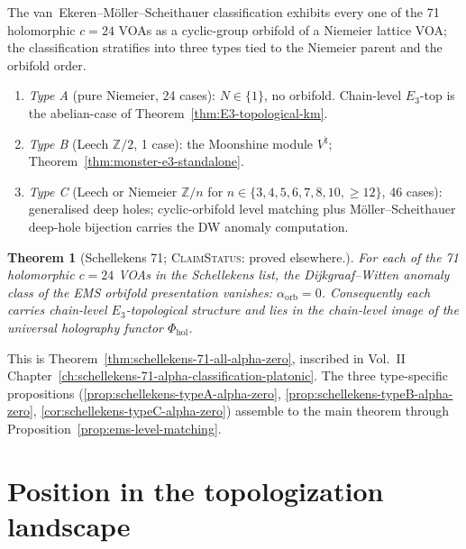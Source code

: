 \documentclass[11pt]{amsart}
\newtheorem{theorem}{Theorem}[section]
\theoremstyle{definition}
\theoremstyle{remark}
\providecommand{\Z}{\mathbb{Z}}
\providecommand{\ClaimStatusProvedElsewhere}{\textsc{ClaimStatus}: proved elsewhere.}
\begin{document}
The van~Ekeren--M\"oller--Scheithauer classification exhibits every
one of the 71 holomorphic $c = 24$ VOAs as a cyclic-group orbifold
of a Niemeier lattice VOA; the classification stratifies into three
types tied to the Niemeier parent and the orbifold order.

\begin{enumerate}[label=(\alph*)]
\item \emph{Type A} (pure Niemeier, 24 cases): $N \in \{1\}$, no
orbifold. Chain-level $E_3$-top is the abelian-case of
Theorem~\ref*{thm:E3-topological-km}.
\item \emph{Type B} (Leech $\Z/2$, 1 case): the Moonshine module
$V^\natural$; Theorem~\ref{thm:monster-e3-standalone}.
\item \emph{Type C} (Leech or Niemeier $\Z/n$ for
$n \in \{3,4,5,6,7,8,10,\geq 12\}$, 46 cases): generalised deep
holes; cyclic-orbifold level matching plus M\"oller--Scheithauer
deep-hole bijection carries the DW anomaly computation.
\end{enumerate}

\begin{theorem}[Schellekens 71; \ClaimStatusProvedElsewhere]
\label{thm:schellekens-71-standalone}
For each of the 71 holomorphic $c = 24$ VOAs in the Schellekens list,
the Dijkgraaf--Witten anomaly class of the EMS orbifold
presentation vanishes: $\alpha_{\mathrm{orb}} = 0$. Consequently each
carries chain-level $E_3$-topological structure and lies in the
chain-level image of the universal holography functor
$\Phi_{\mathrm{hol}}$.
\end{theorem}

This is Theorem~\ref*{thm:schellekens-71-all-alpha-zero}, inscribed
in Vol.~II Chapter~\ref*{ch:schellekens-71-alpha-classification-platonic}.
The three type-specific propositions
(\ref*{prop:schellekens-typeA-alpha-zero},
\ref*{prop:schellekens-typeB-alpha-zero},
\ref*{cor:schellekens-typeC-alpha-zero}) assemble to the main theorem
through Proposition~\ref*{prop:ems-level-matching}.

\section{Position in the topologization landscape}
\end{document}
